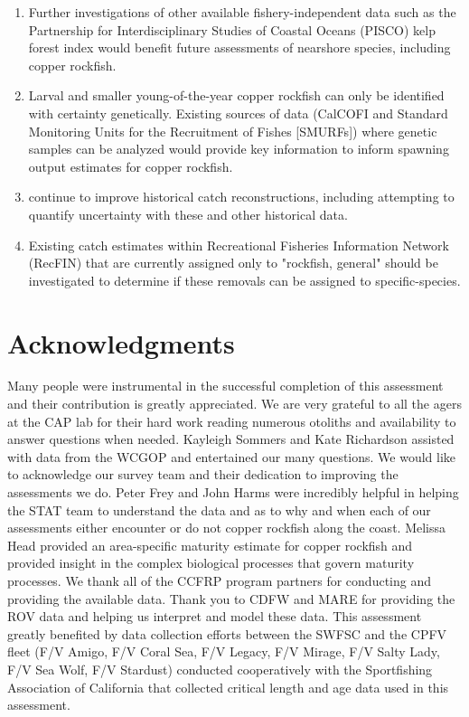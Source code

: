 \documentclass[11pt,
  english,
  letterpaper,
]{article}
\begin{document}
\begin{enumerate}
 \item Further investigations of other available fishery-independent data such as the Partnership for Interdisciplinary Studies of Coastal Oceans (PISCO) kelp forest index would benefit future assessments of nearshore species, including copper rockfish. 

 \item Larval and smaller young-of-the-year copper rockfish can only be identified with certainty genetically. Existing sources of data (CalCOFI and Standard Monitoring Units for the Recruitment of Fishes [SMURFs]) where genetic samples can be analyzed would provide key information to inform spawning output estimates for copper rockfish.
 
  \item continue to improve historical catch reconstructions, including attempting to quantify uncertainty with these and other historical data.
  
  \item Existing catch estimates within Recreational Fisheries Information Network (RecFIN) that are currently assigned only to "rockfish, general" should be investigated to determine if these removals can be assigned to specific-species.



\end{enumerate}

\hypertarget{acknowledgments}{%
\section{Acknowledgments}\label{acknowledgments}}

Many people were instrumental in the successful completion of this assessment and their contribution is greatly appreciated. We are very grateful to all the agers at the CAP lab for their hard work reading numerous otoliths and availability to answer questions when needed. Kayleigh Sommers and Kate Richardson assisted with data from the WCGOP and entertained our many questions. We would like to acknowledge our survey team and their dedication to improving the assessments we do. Peter Frey and John Harms were incredibly helpful in helping the STAT team to understand the data and as to why and when each of our assessments either encounter or do not copper rockfish along the coast. Melissa Head provided an area-specific maturity estimate for copper rockfish and provided insight in the complex biological processes that govern maturity processes. We thank all of the CCFRP program partners for conducting and providing the available data. Thank you to CDFW and MARE for providing the ROV data and helping us interpret and model these data. This assessment greatly benefited by data collection efforts between the SWFSC and the CPFV fleet (F/V Amigo, F/V Coral Sea, F/V Legacy, F/V Mirage, F/V Salty Lady, F/V Sea Wolf, F/V Stardust) conducted cooperatively with the Sportfishing Association of California that collected critical length and age data used in this assessment.
\end{document}
